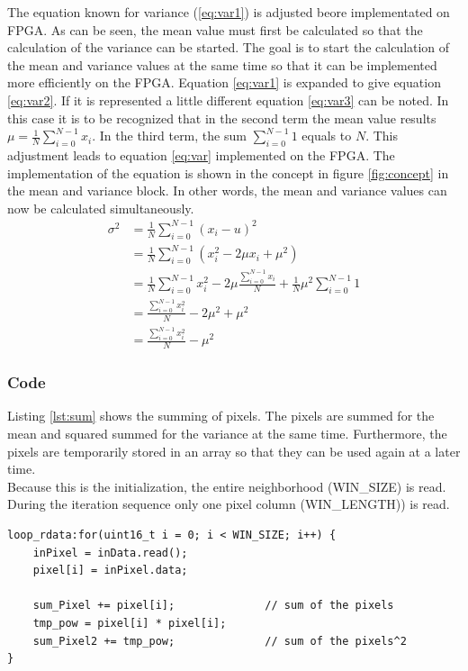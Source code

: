 The equation known for variance (\ref{eq:var1}) is adjusted beore implementated
on FPGA.
As can be seen, the mean value must first be calculated so that the calculation of the
variance can be started. The goal is to start the calculation of the mean
and variance values at the same time so that it can be implemented more
efficiently on the FPGA.
Equation \ref{eq:var1} is expanded to give equation \ref{eq:var2}. If
it is represented a little different equation 
\ref{eq:var3} can be noted. In this case it is to be recognized that in the second term the
mean value results $\mu = \frac{1}{N} \sum_{i = 0}^{N - 1} x_{i}$. In the third term,
the sum $\sum_{i = 0}^{N - 1} 1$ equals to $N$.
This adjustment leads to equation \ref{eq:var} implemented on the FPGA. The
implementation of the equation is shown in the concept in figure \ref{fig:concept} in the mean and variance block. In other words, the mean and variance values can now be calculated simultaneously.
\begin{align}
    \sigma^{2} & = \frac{1}{N} \sum_{i = 0}^{N - 1} (x_{i} - u)^{2} \label{eq:var1}\\ 
    		& = \frac{1}{N} \sum_{i = 0}^{N - 1} (x_{i}^{2} - 2 \mu x_{i} + \mu^{2})  \label{eq:var2}\\
    		& = \frac{1}{N} \sum_{i = 0}^{N - 1} x_{i}^{2} - 2\mu \frac{\sum_{i = 0}^{N - 1} x_{i}}{N} + \frac{1}{N} \mu^{2} \sum_{i = 0}^{N - 1} 1 \label{eq:var3}\\
    		& = \frac{\sum_{i = 0}^{N - 1} x_{i}^{2}}{N}  - 2\mu^{2} + \mu^{2} \label{eq:var4}\\
    		& = \frac{\sum_{i = 0}^{N - 1} x_{i}^{2}}{N}  - \mu^{2}
    \label{eq:var}
\end{align}

\subsubsection*{Code}
Listing \ref{lst:sum} shows the summing of pixels. The pixels are summed for the mean and squared summed for the variance at the same time. Furthermore, the pixels are temporarily stored in an array so that they can be used again at a later time. \\
Because this is the initialization, the entire neighborhood (WIN\_SIZE) is read. During the iteration sequence only one pixel column (WIN\_LENGTH)) is read. \\
\begin{minipage}{\textwidth}
\begin{lstlisting}[style=CStyle, caption=Calculation of the sum, label=lst:sum]
loop_rdata:for(uint16_t i = 0; i < WIN_SIZE; i++) {
	inPixel = inData.read();
	pixel[i] = inPixel.data;

	sum_Pixel += pixel[i];				// sum of the pixels
	tmp_pow = pixel[i] * pixel[i];
	sum_Pixel2 += tmp_pow;				// sum of the pixels^2
}
\end{lstlisting}
\end{minipage}


